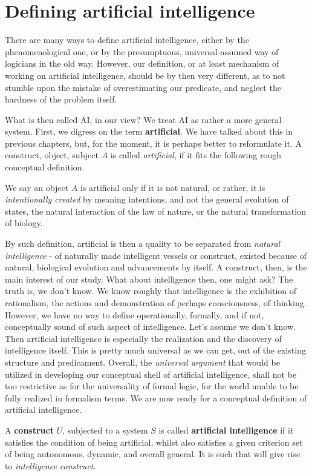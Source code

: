 \section{Defining artificial intelligence}
There are many ways to define artificial intelligence, either by the phenomenological one, or by the presumptuous, universal-assumed way of logicians in the old way. However, our definition, or at least mechanism of working on artificial intelligence, should be by then very different, as to not stumble upon the mistake of overestimating our predicate, and neglect the hardness of the problem itself.

What is then called AI, in our view? We treat AI as rather a more general system. First, we digress on the term \textbf{artificial}. We have talked about this in previous chapters, but, for the moment, it is perhaps better to reformulate it. A construct, object, subject $A$ is called \textit{artificial}, if it fits the following rough conceptual definition. 
\begin{definition}[Artificial]
    We say an object $A$ is artificial only if it is not natural, or rather, it is \textit{intentionally created} by meaning intentions, and not the general evolution of states, the natural interaction of the law of nature, or the natural transformation of biology.
\end{definition}
By such definition, artificial is then a quality to be separated from \textit{natural intelligence} - of naturally made intelligent vessels or construct, existed because of natural, biological evolution and advancements by itself. A construct, then, is the main interest of our study. What about intelligence then, one might ask? The truth is, we don't know. We know roughly that intelligence is the exhibition of rationalism, the actions and demonstration of perhaps consciousness, of thinking. However, we have no way to define operationally, formally, and if not, conceptually sound of such aspect of intelligence. Let's assume we don't know. Then artificial intelligence is especially the realization and the discovery of intelligence itself. This is pretty much universal as we can get, out of the existing structure and predicament. Overall, the \textit{universal argument} that would be utilized in developing our conceptual shell of artificial intelligence, shall not be too restrictive as for the universality of formal logic, for the world unable to be fully realized in formalism terms. We are now ready for a conceptual definition of artificial intelligence. 
\begin{definition}
    A \textbf{construct} $U$, subjected to a system $S$ is called \textbf{artificial intelligence} if it satisfies the condition of being artificial, whilst also satisfies a given criterion set of being autonomous, dynamic, and overall general. It is such that will give rise to \textit{intelligence construct}. 
\end{definition}

